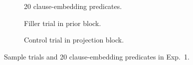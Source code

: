 \documentclass[11pt,fleqn]{article}
\newcommand{\6}{\mbox{$[\hspace*{-.6mm}[$}}
\newcommand{\9}{\mbox{$]\hspace*{-.6mm}]$}}
\begin{document}
\begin{figure}[h!]
\begin{subfigure}[t]{0.5\textwidth}
 \end{subfigure}
 \par\bigskip
\begin{subfigure}[t]{1\textwidth}
        \centering
\caption{20 clause-embedding predicates.}\label{fig-exp1-preds}
\end{subfigure}
\par\bigskip
\begin{subfigure}[t]{0.5\textwidth}
        \centering
{}
\caption{Filler trial in prior block.}\label{fig-exp1-prior-filler}
 \end{subfigure}%
\begin{subfigure}[t]{0.5\textwidth}
\centering
{} 
\caption{Control trial in projection block.}\label{fig-exp1-projection-control}
\end{subfigure}


\caption{Sample trials and 20 clause-embedding predicates in Exp.~1.}
\end{figure}

\end{document}
